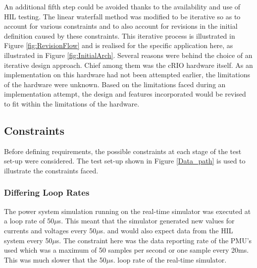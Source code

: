 \documentclass[conference]{IEEEtran}
\begin{document}
An additional fifth step could be avoided thanks to the availability and use of HIL testing. The linear waterfall method was modified to be iterative so as to account for various constraints and to also account for revisions in the initial definition caused by these constraints. This iterative process is illustrated in Figure \ref{fig:RevisionFlow} and is realised for the specific application here, as illustrated in Figure \ref{fig:InitialArch}. Several reasons were behind the choice of an iterative design approach. Chief among them was the cRIO hardware itself. As an implementation on this hardware had not been attempted earlier, the limitations of the hardware were unknown. Based on the limitations faced during an implementation attempt, the design and features incorporated would be revised to fit within the limitations of the hardware. 
\subsection{Constraints}

Before defining requirements, the possible constraints at each stage of the test set-up were considered. The test set-up shown in Figure \ref{Data_path} is used to illustrate the constraints faced.

\subsubsection*{Differing Loop Rates}
The power system simulation running on the real-time simulator was executed at a loop rate of 50$\mu$s. This meant that the simulator generated new values for currents and voltages every 50$\mu$s. and would also expect data from the HIL system every 50$\mu$s. The constraint here was the data reporting rate of the PMU's used which was a maximum of 50 samples per second or one sample every 20ms. This was much slower that the 50$\mu$s. loop rate of the real-time simulator. 
\end{document}
